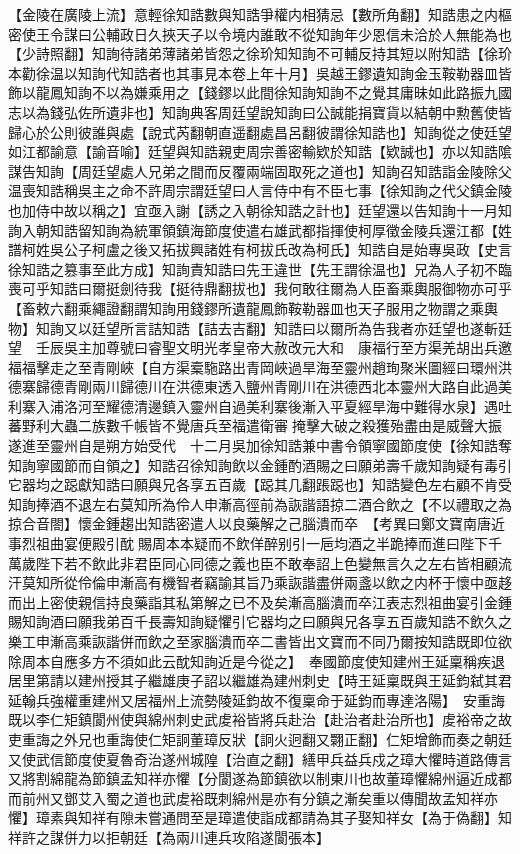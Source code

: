 【金陵在廣陵上流】意輕徐知誥數與知誥爭權内相猜忌【數所角翻】知誥患之内樞密使王令謀曰公輔政日久挾天子以令境内誰敢不從知詢年少恩信未洽於人無能為也【少詩照翻】知詢待諸弟薄諸弟皆怨之徐玠知知詢不可輔反持其短以附知誥【徐玠本勸徐温以知詢代知誥者也其事見本卷上年十月】吳越王鏐遺知詢金玉鞍勒器皿皆飾以龍鳳知詢不以為嫌乘用之【錢鏐以此間徐知詢知詢不之覺其庸昧如此路振九國志以為錢弘佐所遺非也】知詢典客周廷望說知詢曰公誠能捐寶貨以結朝中勲舊使皆歸心於公則彼誰與處【說式芮翻朝直遥翻處昌呂翻彼謂徐知誥也】知詢從之使廷望如江都諭意【諭音喻】廷望與知誥親吏周宗善密輸欵於知誥【欵誠也】亦以知誥隂謀告知詢【周廷望處人兄弟之間而反覆兩端固取死之道也】知詢召知誥詣金陵除父温喪知誥稱吳主之命不許周宗謂廷望曰人言侍中有不臣七事【徐知詢之代父鎮金陵也加侍中故以稱之】宜亟入謝【誘之入朝徐知誥之計也】廷望還以告知詢十一月知詢入朝知誥留知詢為統軍領鎮海節度使遣右雄武都指揮使柯厚徵金陵兵還江都【姓譜柯姓吳公子柯盧之後又拓拔興諸姓有柯拔氏改為柯氏】知誥自是始專吳政【史言徐知誥之篡事至此方成】知詢責知誥曰先王違世【先王謂徐温也】兄為人子初不臨喪可乎知誥曰爾挺劍待我【挺待鼎翻拔也】我何敢往爾為人臣畜乘輿服御物亦可乎【畜敕六翻乘繩證翻謂知詢用錢鏐所遺龍鳳飾鞍勒器皿也天子服用之物謂之乘輿物】知詢又以廷望所言詰知誥【詰去吉翻】知誥曰以爾所為告我者亦廷望也遂斬廷望　壬辰吳主加尊號曰睿聖文明光孝皇帝大赦改元大和　康福行至方渠羌胡出兵邀福福擊走之至青剛峽【自方渠槖駞路出青岡峽過旱海至靈州趙珣聚米圖經曰環州洪德寨歸德青剛兩川歸德川在洪德東透入鹽州青剛川在洪德西北本靈州大路自此過美利寨入浦洛河至耀德清邊鎮入靈州自過美利寨後漸入平夏經旱海中難得水泉】遇吐蕃野利大蟲二族數千帳皆不覺唐兵至福遣衛審掩擊大破之殺獲殆盡由是威聲大振遂進至靈州自是朔方始受代　十二月吳加徐知誥兼中書令領寧國節度使【徐知誥奪知詢寧國節而自領之】知誥召徐知詢飲以金鍾酌酒賜之曰願弟壽千歲知詢疑有毒引它器均之跽獻知誥曰願與兄各享五百歲【跽其几翻䠆跽也】知誥變色左右顧不肯受知詢捧酒不退左右莫知所為伶人申漸高徑前為詼諧語掠二酒合飲之【不以禮取之為掠合音閤】懷金鍾趨出知誥密遣人以良藥解之己腦潰而卒　【考異曰鄭文寶南唐近事烈祖曲宴便殿引酖賜周本本疑而不飲佯醉别引一巵均酒之半跪捧而進曰陛下千萬歲陛下若不飲此非君臣同心同德之義也臣不敢奉詔上色變無言久之左右皆相顧流汗莫知所從伶倫申漸高有機智者竊諭其旨乃乘詼諧盡併兩盞以飲之内杯于懷中亟趍而出上密使親信持良藥詣其私第解之已不及矣漸高腦潰而卒江表志烈祖曲宴引金鍾賜知詢酒曰願我弟百千長壽知詢疑懼引它器均之曰願與兄各享五百歲知誥不飲久之樂工申漸高乘詼諧併而飲之至家腦潰而卒二書皆出文寶而不同乃爾按知誥既即位欲除周本自應多方不須如此云酖知詢近是今從之】　奉國節度使知建州王延稟稱疾退居里第請以建州授其子繼雄庚子詔以繼雄為建州刺史【時王延稟既與王延鈞弑其君延翰兵強權重建州又居福州上流勢陵延鈞故不復稟命于延鈞而專達洛陽】　安重誨既以李仁矩鎮閬州使與綿州刺史武䖍裕皆將兵赴治【赴治者赴治所也】䖍裕帝之故吏重誨之外兄也重誨使仁矩詗董璋反狀【詗火迥翻又翾正翻】仁矩增飾而奏之朝廷又使武信節度使夏魯奇治遂州城隍【治直之翻】繕甲兵益兵戍之璋大懼時道路傳言又將割綿龍為節鎮孟知祥亦懼【分閬遂為節鎮欲以制東川也故董璋懼綿州逼近成都而前州又鄧艾入蜀之道也武䖍裕既刺綿州是亦有分鎮之漸矣重以傳聞故孟知祥亦懼】璋素與知祥有隙未嘗通問至是璋遣使詣成都請為其子娶知祥女【為于偽翻】知祥許之謀併力以拒朝廷【為兩川連兵攻陷遂閬張本】


